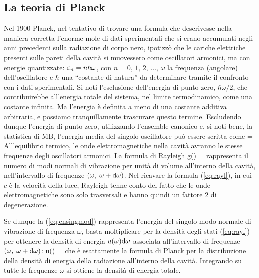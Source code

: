 \subsection{La teoria di Planck}
Nel 1900 Planck, nel tentativo di trovare una formula che descrivesse nella maniera corretta l'enorme mole di dati sperimentali che si erano accumulati negli anni precedenti sulla radiazione di corpo nero, ipotizzò che le cariche elettriche presenti sulle pareti della cavità si muovessero come oscillatori armonici, ma con energie quantizzate: $\varepsilon_n = n\hbar\omega$, con $n = 0,\,1,\,2,\,\ldots$, $\omega$ la frequenza (angolare) dell'oscillatore e $\hbar$ una ``costante di natura'' da determinare tramite il confronto con i dati sperimentali. Si noti l'esclusione dell'energia di punto zero, $\hbar\omega/2$, che contribuirebbe all'energia totale del sistema, nel limite termodinamico, come una costante infinita. Ma l'energia è definita a meno di una costante additiva arbitraria, e possiamo tranquillamente trascurare questo termine. Escludendo dunque l'energia di punto zero, utilizzando l'ensemble canonico e, si noti bene, la statistica di MB, l'energia media del singolo oscillatore può essere scritta come 
\be
\label{eq:ensingmod}
\langle \eps \rangle = 
\ee
All'equilibrio termico, le onde elettromagnetiche nella cavità avranno le stesse frequenze degli oscillatori armonici. La formula di Rayleigh
\be
\label{eq:rayl}
g(\omega)\de{\omega} = \de{\omega}
\ee
rappresenta il numero di modi normali di vibrazione per unità di volume all'interno della cavità, nell'intervallo di frequenze $(\omega,\;\omega+{\textrm d}\omega)$. Nel ricavare la formula (\ref{eq:rayl}), in cui $c$ è la velocità della luce, Rayleigh tenne conto del fatto che le onde elettromagnetiche sono solo trasversali e hanno quindi un fattore $2$ di degenerazione.

Se dunque la (\ref{eq:ensingmod}) rappresenta l'energia del singolo modo normale di vibrazione di frequenza $\omega$, basta moltiplicare per la densità degli stati (\ref{eq:rayl}) per ottenere la densità di energia $u(\omega){\textrm d}\omega$ associata all'intervallo di frequenze
$(\omega,\;\omega+{\textrm d}\omega)$:
\be
\label{eq:bbplanck}
u(\omega)\de{\omega} = 
\de{\omega}
\ee
che è esattamente la formula di Planck per la distribuzione della densità di energia della radiazione all'interno della cavità. Integrando su tutte le frequenze $\omega$ si ottiene la densità di energia totale.

